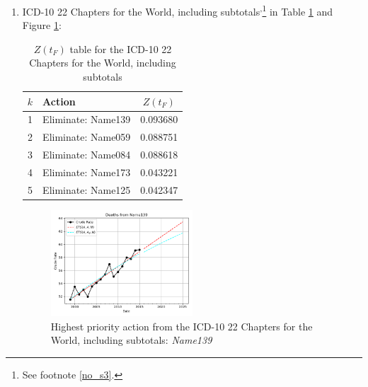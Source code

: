\documentclass[12pt, a4paper, twocolumn]{article}
\begin{document}
\begin{enumerate}
  \item ICD-10 22 Chapters for the World, including subtotals\cite{whomortality}\textsuperscript{,}\footnote{See footnote \ref{no_s3}.} in Table \ref{table:ztable9} and Figure \ref{fig:k9}:
    \begin{table}[H]
      \centering
      \begin{tabular}{clc}
        \toprule
          $k$ & Action             & $Z(t_F)$ \\
        \midrule
          1   & Eliminate: Name139 & 0.093680 \\
          2   & Eliminate: Name059 & 0.088751 \\
          3   & Eliminate: Name084 & 0.088618 \\
          4   & Eliminate: Name173 & 0.043221 \\
          5   & Eliminate: Name125 & 0.042347 \\
        \bottomrule
      \end{tabular}
      \caption{$Z(t_F)$ table for the ICD-10 22 Chapters for the World, including subtotals}
      \label{table:ztable9}
    \end{table}
    \begin{figure}[H]
      \centering
      \includegraphics[width=0.5\textwidth]{results/WORLD_ICD10_CHAPTERS_ALL/Name139_ets.png}
      \caption{Highest priority action from the ICD-10 22 Chapters for the World, including subtotals: \textit{Name139}}\label{fig:k9}
    \end{figure}
  

\end{enumerate}
\end{document}
